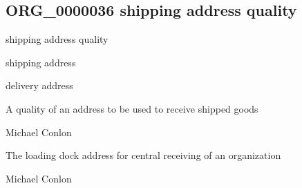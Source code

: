 \documentclass[letterpaper,10pt,english]{sphinxmanual}
\begin{document}
\subsection{ORG\_0000036 \sphinxhyphen{} shipping address quality}
\label{\detokenize{doc-ORG_0000036:org-0000036-shipping-address-quality}}\label{\detokenize{doc-ORG_0000036:index-0}}\label{\detokenize{doc-ORG_0000036::doc}}
\begin{sphinxShadowBox}

\sphinxAtStartPar
shipping address quality
\end{sphinxShadowBox}

\begin{sphinxShadowBox}

\sphinxAtStartPar
shipping address
\end{sphinxShadowBox}

\begin{sphinxShadowBox}

\sphinxAtStartPar
delivery address
\end{sphinxShadowBox}

\begin{sphinxShadowBox}

\sphinxAtStartPar
{\hyperref[\detokenize{doc-BFO_0000019::doc}]{}}
\end{sphinxShadowBox}

\begin{sphinxShadowBox}

\sphinxAtStartPar
A quality of an address to be used to receive shipped goods
\end{sphinxShadowBox}

\begin{sphinxShadowBox}

\sphinxAtStartPar
Michael Conlon 
\end{sphinxShadowBox}

\begin{sphinxShadowBox}

\sphinxAtStartPar
The loading dock address for central receiving of an organization
\end{sphinxShadowBox}

\begin{sphinxShadowBox}

\sphinxAtStartPar
Michael Conlon 
\end{sphinxShadowBox}
\begin{quote}

\ignorespaces \end{quote}
\end{document}
